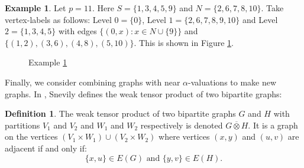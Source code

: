 \documentclass[12pt, a4paper]{article}
\theoremstyle{definition}
\newtheorem{example}[theorem]{Example}
\newtheorem{definition}[theorem]{Definition}
\begin{document}
\begin{example}\label{nearalphaexmp}
Let $p=11$.  Here $S=\{1,3,4,5,9\}$ and $N=\{2,6,7,8,10\}$. Take vertex-labels as follows: Level $0=\{0\}$, Level $1=\{2,6,7,8,9,10\}$ and Level $2=\{1,3,4,5\}$ with edges $\{(0,x): x \in N \cup \{9\}\}$ and $\{(1,2), (3,6), (4,8), (5,10)\}$. This is shown in Figure \ref{fig:nearalphaexmp}.
\end{example}

\begin{figure}
    \centering
    \caption{Example \ref{nearalphaexmp}}
    \label{fig:nearalphaexmp}
\end{figure}


Finally, we consider combining graphs with near $\alpha$-valuations to make new graphs.  In \cite{Snevily}, Snevily defines the weak tensor product of two bipartite graphs:

\begin{definition}
The weak tensor product of two bipartite graphs $G$ and $H$ with partitions $V_1$ and $V_2$ and $W_1$ and $W_2$ respectively is denoted $G \overline{\otimes} H$. It is a graph on the vertices $(V_1 \times W_1) \cup (V_2 \times W_2)$ where vertices $(x,y)$ and $(u,v)$ are adjacent if and only if:
\[\{x,u\} \in E(G) \mbox{ and }\{y,v\} \in E(H).\]
\end{definition}
\end{document}
